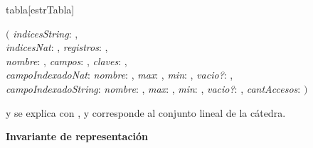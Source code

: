 \begin{Representacion}
  

  \begin{Estructura}{tabla}[estrTabla]
    \begin{flushright}
      $\Big($
      \emph{indicesString}: , \veryquad \\
        \emph{indicesNat}: ,
        \emph{registros}: , \veryquad \\
        \emph{nombre}: ,
        \emph{campos}: ,
        \emph{claves}: , \veryquad \\
        \emph{campoIndexadoNat}: \emph{nombre}: , \emph{max}: , \emph{min}: , \emph{vacio?}: , \veryquad \\
        \emph{campoIndexadoString}: \emph{nombre}: , \emph{max}: , \emph{min}: , \emph{vacio?}: ,
        \emph{cantAccesos}: 
        $\Big)$ \veryquad
      \end{flushright}
     y se explica con , y  corresponde al conjunto lineal de la cátedra.
  \end{Estructura}

  \noindent\textbf{Invariante de representación}
  

\end{Representacion}
